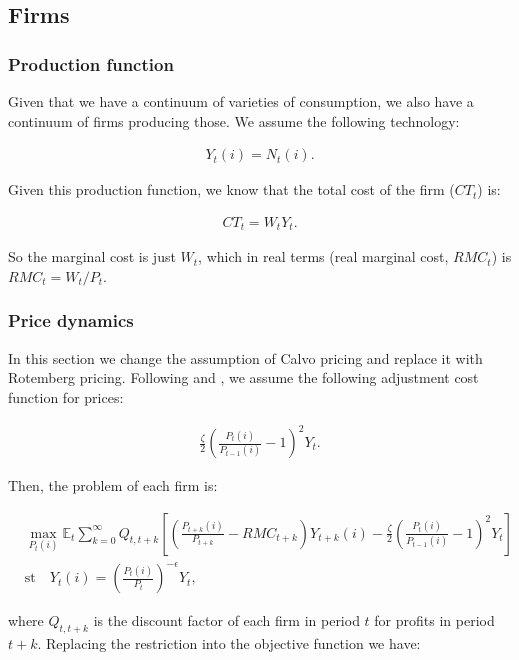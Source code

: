 \documentclass[11pt]{article}
\numberwithin{equation}{section}
\begin{document}
\subsection{Firms}

\subsubsection{Production function}

Given that we have a continuum of varieties of consumption, we also have a continuum of firms producing those. We assume the following technology:

\begin{align*}
Y_t(i)=N_t(i).
\end{align*}

Given this production function, we know that the total cost of the firm ($CT_t$) is:

\begin{align*}
CT_t=W_tY_t.
\end{align*}

So the marginal cost is just $W_t$, which in real terms (real marginal cost, $RMC_t$) is $RMC_t=W_t/P_t$.

\subsubsection{Price dynamics}

In this section we change the assumption of Calvo pricing and replace it with Rotemberg pricing. Following \cite{AscariEtAl2012} and \cite{Rotemberg1982}, we assume the following adjustment cost function for prices:

\begin{align*}
\frac{\zeta}{2}\left(\frac{P_t(i)}{P_{t-1}(i)}-1\right)^2Y_t.
\end{align*}

Then, the problem of each firm is:

\begin{align*}
&\max_{P_t(i)} \mathbb{E}_t \sum_{k=0}^{\infty}Q_{t,t+k}\left[\left(\frac{P_{t+k}(i)}{P_{t+k}} - RMC_{t+k} \right)Y_{t+k}(i) - \frac{\zeta}{2}\left(\frac{P_t(i)}{P_{t-1}(i)}-1\right)^2Y_t\right]\\
&\text{st} \quad Y_t(i)=\left(\frac{P_t(i)}{P_t}\right)^{-\epsilon}Y_t,
\end{align*}

where $Q_{t,t+k}$ is the discount factor of each firm in period $t$ for profits in period $t+k$. Replacing the restriction into the objective function we have:
\end{document}
